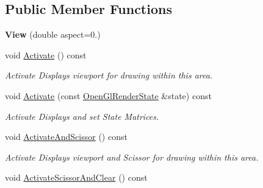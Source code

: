 \subsection*{Public Member Functions}
\begin{DoxyCompactItemize}
\item 
{\bfseries View} (double aspect=0.)\hypertarget{structpangolin_1_1_view_af365f40a3f6fbdad8e6164c85f1cb227}{}\label{structpangolin_1_1_view_af365f40a3f6fbdad8e6164c85f1cb227}

\item 
void \hyperlink{structpangolin_1_1_view_a6167990d8a521f66c7eb3c0943a95e13}{Activate} () const \hypertarget{structpangolin_1_1_view_a6167990d8a521f66c7eb3c0943a95e13}{}\label{structpangolin_1_1_view_a6167990d8a521f66c7eb3c0943a95e13}

\begin{DoxyCompactList}\small\item\em Activate Displays viewport for drawing within this area. \end{DoxyCompactList}\item 
void \hyperlink{structpangolin_1_1_view_a50f036358265f89c928339ac3a0fbbe1}{Activate} (const \hyperlink{classpangolin_1_1_open_gl_render_state}{Open\+Gl\+Render\+State} \&state) const \hypertarget{structpangolin_1_1_view_a50f036358265f89c928339ac3a0fbbe1}{}\label{structpangolin_1_1_view_a50f036358265f89c928339ac3a0fbbe1}

\begin{DoxyCompactList}\small\item\em Activate Displays and set State Matrices. \end{DoxyCompactList}\item 
void \hyperlink{structpangolin_1_1_view_aa782fddf295d6d7386c27df5fd1a0e63}{Activate\+And\+Scissor} () const \hypertarget{structpangolin_1_1_view_aa782fddf295d6d7386c27df5fd1a0e63}{}\label{structpangolin_1_1_view_aa782fddf295d6d7386c27df5fd1a0e63}

\begin{DoxyCompactList}\small\item\em Activate Displays viewport and Scissor for drawing within this area. \end{DoxyCompactList}\item 
void \hyperlink{structpangolin_1_1_view_aa86b155c4c7acce378b666686bbe9405}{Activate\+Scissor\+And\+Clear} () const \hypertarget{structpangolin_1_1_view_aa86b155c4c7acce378b666686bbe9405}{}\label{structpangolin_1_1_view_aa86b155c4c7acce378b666686bbe9405}


\end{DoxyCompactItemize}
